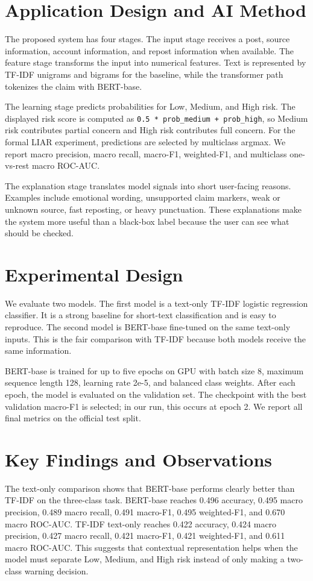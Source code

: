 \documentclass[10pt]{article}
\begin{document}
\section{Application Design and AI Method}
The proposed system has four stages. The input stage receives a post, source information, account information, and repost information when available. The feature stage transforms the input into numerical features. Text is represented by TF-IDF unigrams and bigrams for the baseline, while the transformer path tokenizes the claim with BERT-base.

The learning stage predicts probabilities for Low, Medium, and High risk. The displayed risk score is computed as \texttt{0.5 * prob\_medium + prob\_high}, so Medium risk contributes partial concern and High risk contributes full concern. For the formal LIAR experiment, predictions are selected by multiclass argmax. We report macro precision, macro recall, macro-F1, weighted-F1, and multiclass one-vs-rest macro ROC-AUC.

The explanation stage translates model signals into short user-facing reasons. Examples include emotional wording, unsupported claim markers, weak or unknown source, fast reposting, or heavy punctuation. These explanations make the system more useful than a black-box label because the user can see what should be checked.

\section{Experimental Design}
We evaluate two models. The first model is a text-only TF-IDF logistic regression classifier. It is a strong baseline for short-text classification and is easy to reproduce. The second model is BERT-base fine-tuned on the same text-only inputs. This is the fair comparison with TF-IDF because both models receive the same information.

BERT-base is trained for up to five epochs on GPU with batch size 8, maximum sequence length 128, learning rate 2e-5, and balanced class weights. After each epoch, the model is evaluated on the validation set. The checkpoint with the best validation macro-F1 is selected; in our run, this occurs at epoch 2. We report all final metrics on the official test split.

\section{Key Findings and Observations}
The text-only comparison shows that BERT-base performs clearly better than TF-IDF on the three-class task. BERT-base reaches 0.496 accuracy, 0.495 macro precision, 0.489 macro recall, 0.491 macro-F1, 0.495 weighted-F1, and 0.670 macro ROC-AUC. TF-IDF text-only reaches 0.422 accuracy, 0.424 macro precision, 0.427 macro recall, 0.421 macro-F1, 0.421 weighted-F1, and 0.611 macro ROC-AUC. This suggests that contextual representation helps when the model must separate Low, Medium, and High risk instead of only making a two-class warning decision.
\end{document}
